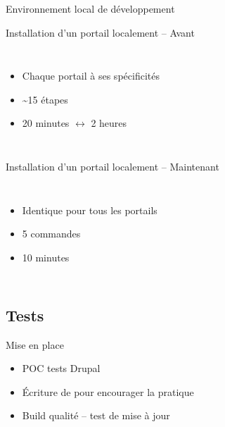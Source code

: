 \begin{frame}{Environnement local de développement}
	\begin{overprint}
		\begin{block}{Installation d'un portail localement -- Avant}
			\begin{columns}[onlytextwidth]
				\begin{itemize}
					\item Chaque portail à ses spécificités
					\item \textasciitilde 15 étapes
					\item 20 minutes $\longleftrightarrow$ 2 heures
				\end{itemize}
			\end{columns}
		\end{block}
		\begin{block}{Installation d'un portail localement -- Maintenant}
			\begin{columns}[onlytextwidth]
				\begin{itemize}
					\item Identique pour tous les portails
					\item 5 commandes
					\item 10 minutes
				\end{itemize}
			\end{columns}
		\end{block}
	\end{overprint}
\end{frame}

\subsection{Tests}
\begin{frame}{\subsecname}
	\begin{block}{Mise en place}
		\begin{itemize}
			\item POC tests Drupal
			\item Écriture de  pour encourager la pratique
			\item Build qualité -- test de mise à jour
		\end{itemize}
	\end{block}
\end{frame}

